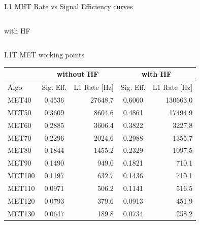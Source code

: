 \documentclass[8pt]{beamer}
\begin{document}
\begin{frame}{L1 MHT Rate vs Signal Efficiency curves}
\begin{columns}
\begin{block}{with HF}
\end{block}

\end{columns}

\end{frame}

\begin{frame}{L1T MET working points}
 
\begin{tabular}{|l|c|r||c|r|}
\hline
     & \multicolumn{2}{c||}{without HF} & \multicolumn{2}{c|}{with HF} \\
\hline \hline
Algo & Sig. Eff. & L1 Rate [Hz] & Sig. Eff. & L1 Rate [Hz] \\
\hline \hline
 MET40 & 0.4536 & 27648.7 & 0.6060 & 130663.0 \\
 MET50 & 0.3609 &  8604.6 & 0.4861 &  17494.9 \\
 MET60 & 0.2885 &  3606.4 & 0.3822 &   3227.8 \\
 MET70 & 0.2296 &  2024.6 & 0.2988 &   1355.7 \\
 MET80 & 0.1844 &  1455.2 & 0.2329 &   1097.5 \\
 MET90 & 0.1490 &   949.0 & 0.1821 &    710.1 \\
MET100 & 0.1197 &   632.7 & 0.1436 &    710.1 \\
MET110 & 0.0971 &   506.2 & 0.1141 &    516.5 \\
MET120 & 0.0793 &   379.6 & 0.0913 &    451.9 \\
MET130 & 0.0647 &   189.8 & 0.0734 &    258.2 \\
\hline
\end{tabular}
 
\end{frame}
\end{document}
